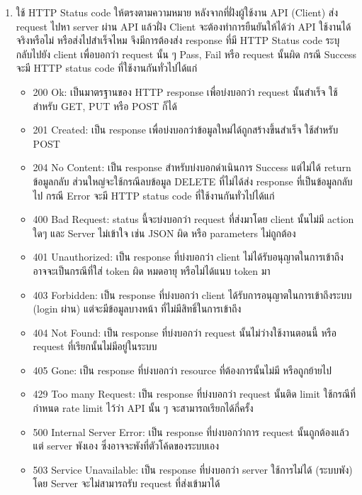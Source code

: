 \documentclass[14pt,oneside,openright,a4paper]{cpe-thai-project}
\begin{document}
\begin{enumerate}
        \item ใช้ HTTP Status code ให้ตรงตามความหมาย
              หลังจากที่ฝั่งผู้ใช้งาน API (Client) ส่ง request ไปหา server ผ่าน API แล้วฝั่ง Client จะต้องทำการยืนยันให้ได้ว่า API ใช้งานได้จริงหรือไม่ หรือส่งไปสำเร็จไหม จึงมีการต้องส่ง response ที่มี HTTP Status code ระบุ กลับไปยัง client เพื่อบอกว่า request นั้น ๆ Pass, Fail หรือ request นั้นผิด
              กรณี Success จะมี HTTP status code ที่ใช้งานกันทั่วไปได้แก่ 
          \begin{itemize}
            \item 200 Ok: เป็นมาตรฐานของ HTTP response เพื่อบ่งบอกว่า request นั้นสำเร็จ ใช้สำหรับ GET, PUT หรือ POST ก็ได้
            \item 201 Created: เป็น response เพื่อบ่งบอกว่าข้อมูลใหม่ได้ถูกสร้างขึ้นสำเร็จ ใช้สำหรับ POST
            \item 204 No Content: เป็น response สำหรับบ่งบอกดำเนินการ Success แต่ไม่ได้ return ข้อมูลกลับ ส่วนใหญ่จะใช้กรณีลบข้อมูล DELETE ที่ไม่ได้ส่ง response ที่เป็นข้อมูลกลับไป
                  กรณี Error จะมี HTTP status code ที่ใช้งานกันทั่วไปได้แก่
            \item 400 Bad Request: status นี้จะบ่งบอกว่า request ที่ส่งมาโดย client นั้นไม่มี action ใดๆ และ Server ไม่เข้าใจ เช่น JSON ผิด หรือ parameters ไม่ถูกต้อง
            \item 401 Unauthorized: เป็น response ที่บ่งบอกว่า client ไม่ได้รับอนุญาตในการเข้าถึง อาจจะเป็นกรณีที่ใส่ token ผิด หมดอายุ หรือไม่ได้แนบ token มา
            \item 403 Forbidden: เป็น response ที่บ่งบอกว่า client ได้รับการอนุญาตในการเข้าถึงระบบ (login ผ่าน) แต่จะมีข้อมูลบางหน้า ที่ไม่มีสิทธิ์ในการเข้าถึง
            \item 404 Not Found: เป็น response ที่บ่งบอกว่า request นั้นไม่ว่างใช้งานตอนนี้ หรือ request ที่เรียกนั้นไม่มีอยู่ในระบบ
            \item 405 Gone: เป็น response ที่บ่งบอกว่า resource ที่ต้องการนั้นไม่มี หรือถูกย้ายไป
            \item 429 Too many Request: เป็น response ที่บ่งบอกว่า request นั้นติด limit ใช้กรณีที่กำหนด rate limit ไว้ว่า API นั้น ๆ จะสามารถเรียกได้กี่ครั้ง
            \item 500 Internal Server Error: เป็น response ที่บ่งบอกว่าการ request นั้นถูกต้องแล้ว แต่ server พังเอง ซึ่งอาจจะพังที่ตัวโค้ดของระบบเอง
            \item 503 Service Unavailable: เป็น response ที่บ่งบอกว่า server ใช้การไม่ได้ (ระบบพัง) โดย Server จะไม่สามารถรับ request ที่ส่งเข้ามาได้

\end{itemize}
\end{enumerate}
\end{document}
